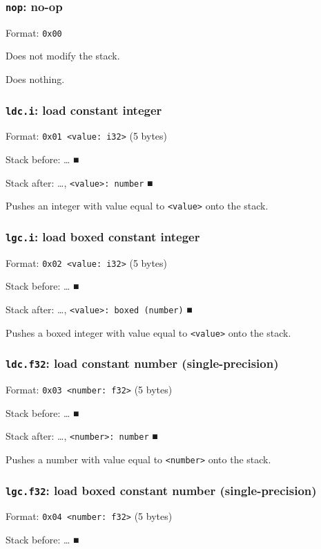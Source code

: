 \subsubsection{\texttt{nop}: no-op}
\label{sec:orgbc7ec8d}
Format: \texttt{0x00}

Does not modify the stack.

Does nothing.

\subsubsection{\texttt{ldc.i}: load constant integer}
\label{sec:orgc756866}
Format: \texttt{0x01 <value: i32>} (5 bytes)

Stack before: \ldots{}​ ■

Stack after: \ldots{}​, \texttt{<value>: number} ■

Pushes an integer with value equal to \texttt{<value>} onto the stack.

\subsubsection{\texttt{lgc.i}: load boxed constant integer}
\label{sec:org5cf9345}
Format: \texttt{0x02 <value: i32>} (5 bytes)

Stack before: \ldots{}​ ■

Stack after: \ldots{}​, \texttt{<value>: boxed (number)} ■

Pushes a boxed integer with value equal to \texttt{<value>} onto the stack.

\subsubsection{\texttt{ldc.f32}: load constant number (single-precision)}
\label{sec:orgd3689f6}
Format: \texttt{0x03 <number: f32>} (5 bytes)

Stack before: \ldots{}​ ■

Stack after: \ldots{}​, \texttt{<number>: number} ■

Pushes a number with value equal to \texttt{<number>} onto the stack.

\subsubsection{\texttt{lgc.f32}: load boxed constant number (single-precision)}
\label{sec:orgee247e4}
Format: \texttt{0x04 <number: f32>} (5 bytes)

Stack before: \ldots{}​ ■

